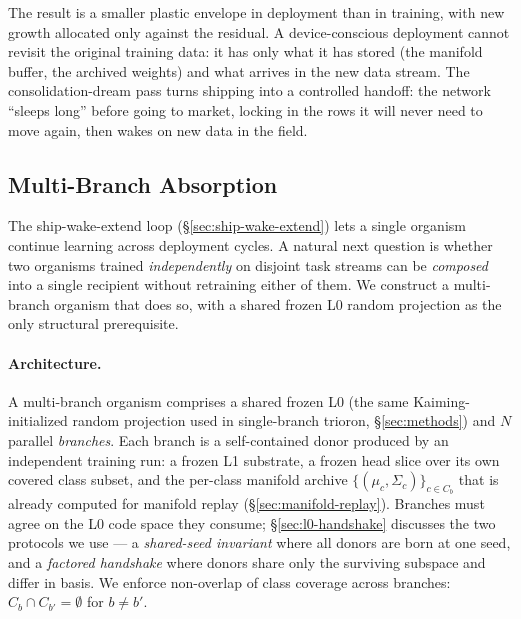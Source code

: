 \documentclass[11pt]{article}
\begin{document}
The result is a smaller plastic envelope in deployment than in
training, with new growth allocated only against the residual. A
device-conscious deployment cannot revisit the original training
data: it has only what it has stored (the manifold buffer, the
archived weights) and what arrives in the new data stream. The
consolidation-dream pass turns shipping into a controlled handoff:
the network ``sleeps long'' before going to market, locking in the
rows it will never need to move again, then wakes on new data in the
field.

\subsection{Multi-Branch Absorption}
\label{sec:absorption}\label{app:absorption}

The ship-wake-extend loop (\S\ref{sec:ship-wake-extend}) lets a single
organism continue learning across deployment cycles. A natural next
question is whether two organisms trained \emph{independently} on
disjoint task streams can be \emph{composed} into a single recipient
without retraining either of them. We construct a multi-branch
organism that does so, with a shared frozen L0 random projection as
the only structural prerequisite.

\paragraph{Architecture.}
A multi-branch organism comprises a shared frozen L0 (the same
Kaiming-initialized random projection used in single-branch trioron,
\S\ref{sec:methods}) and $N$ parallel \emph{branches}. Each branch is
a self-contained donor produced by an independent training run: a
frozen L1 substrate, a frozen head slice over its own covered class
subset, and the per-class manifold archive
$\{(\mu_c, \Sigma_c)\}_{c \in C_b}$ that is already computed for
manifold replay (\S\ref{sec:manifold-replay}). Branches must agree on
the L0 code space they consume; \S\ref{sec:l0-handshake} discusses the
two protocols we use --- a \emph{shared-seed invariant} where all
donors are born at one seed, and a \emph{factored handshake} where
donors share only the surviving subspace and differ in basis. We
enforce non-overlap of class coverage across branches:
$C_b \cap C_{b'} = \emptyset$ for $b \neq b'$.
\end{document}
